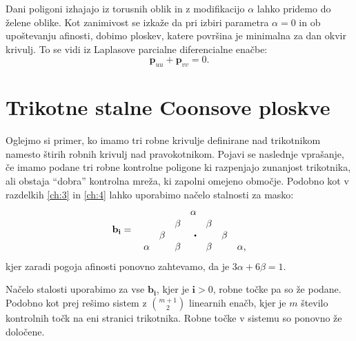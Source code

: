 \documentclass[a4paper,12pt]{article}
\begin{document}
Dani poligoni izhajajo iz torusnih oblik in z modifikacijo $\alpha$ lahko pridemo do želene oblike.
Kot zanimivost se izkaže da pri izbiri parametra $\alpha = 0$ in ob upoštevanju afinosti,
dobimo ploskev, katere površina je minimalna za dan okvir krivulj. To se vidi iz Laplasove parcialne 
diferencialne enačbe:
$$\mathbf{p}_{uu} + \mathbf{p}_{vv} = 0.$$

\section{Trikotne stalne Coonsove ploskve}

Oglejmo si primer, ko imamo tri robne krivulje definirane nad trikotnikom 
namesto štirih robnih krivulj nad pravokotnikom.
Pojavi se naslednje vprašanje, če imamo podane tri robne kontrolne poligone 
ki razpenjajo zunanjost trikotnika, ali obstaja  ``dobra''
kontrolna mreža, ki zapolni omejeno območje. 
Podobno kot v razdelkih \ref{ch:3} in \ref{ch:4} lahko uporabimo načelo 
stalnosti za masko:
$$
\mathbf{b}_{\mathbf{i}} =  \quad 
\begin{matrix*}[r]
          &       &       & \alpha   &       &       & \\
          &       & \beta &          & \beta &       & \\
          &         \beta &       & \sbullet &       & \beta & \\
   \alpha &       & \beta &          & \beta &       & \alpha,
\end{matrix*}
$$
kjer zaradi pogoja afinosti ponovno zahtevamo, da je $3\alpha + 6\beta = 1$.

Načelo stalosti uporabimo za vse $\mathbf{b}_{\mathbf{i}}$, kjer je $\mathbf{i} >0$,
robne točke pa so že podane. 
Podobno kot prej rešimo sistem z $\binom{m+1}{2}$ linearnih enačb, 
kjer je $m$ število kontrolnih točk na eni stranici trikotnika.
Robne točke v sistemu so ponovno že določene.
\end{document}
